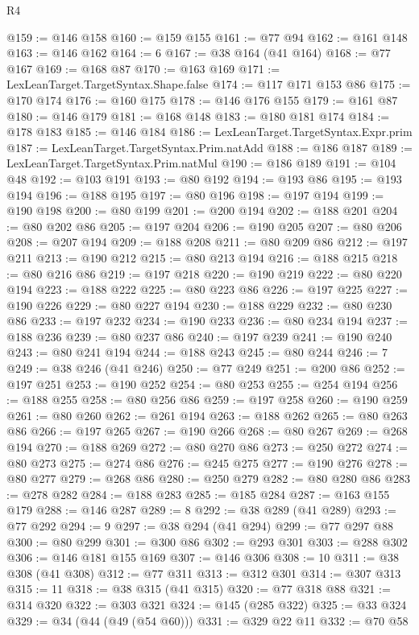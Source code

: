 \begin{lexlean}{R4}
\begin{coremodule}
@159 := @146 @158
@160 := @159 @155
@161 := @77 @94
@162 := @161 @148
@163 := @146 @162
@164 := 6
@167 := @38 @164 (@41 @164)
@168 := @77 @167
@169 := @168 @87
@170 := @163 @169
@171 := LexLeanTarget.TargetSyntax.Shape.false
@174 := @117 @171 @153 @86
@175 := @170 @174
@176 := @160 @175
@178 := @146 @176 @155
@179 := @161 @87
@180 := @146 @179
@181 := @168 @148
@183 := @180 @181 @174
@184 := @178 @183
@185 := @146 @184
@186 := LexLeanTarget.TargetSyntax.Expr.prim
@187 := LexLeanTarget.TargetSyntax.Prim.natAdd
@188 := @186 @187
@189 := LexLeanTarget.TargetSyntax.Prim.natMul
@190 := @186 @189
@191 := @104 @48
@192 := @103 @191
@193 := @80 @192
@194 := @193 @86
@195 := @193 @194
@196 := @188 @195
@197 := @80 @196
@198 := @197 @194
@199 := @190 @198
@200 := @80 @199
@201 := @200 @194
@202 := @188 @201
@204 := @80 @202 @86
@205 := @197 @204
@206 := @190 @205
@207 := @80 @206
@208 := @207 @194
@209 := @188 @208
@211 := @80 @209 @86
@212 := @197 @211
@213 := @190 @212
@215 := @80 @213 @194
@216 := @188 @215
@218 := @80 @216 @86
@219 := @197 @218
@220 := @190 @219
@222 := @80 @220 @194
@223 := @188 @222
@225 := @80 @223 @86
@226 := @197 @225
@227 := @190 @226
@229 := @80 @227 @194
@230 := @188 @229
@232 := @80 @230 @86
@233 := @197 @232
@234 := @190 @233
@236 := @80 @234 @194
@237 := @188 @236
@239 := @80 @237 @86
@240 := @197 @239
@241 := @190 @240
@243 := @80 @241 @194
@244 := @188 @243
@245 := @80 @244
@246 := 7
@249 := @38 @246 (@41 @246)
@250 := @77 @249
@251 := @200 @86
@252 := @197 @251
@253 := @190 @252
@254 := @80 @253
@255 := @254 @194
@256 := @188 @255
@258 := @80 @256 @86
@259 := @197 @258
@260 := @190 @259
@261 := @80 @260
@262 := @261 @194
@263 := @188 @262
@265 := @80 @263 @86
@266 := @197 @265
@267 := @190 @266
@268 := @80 @267
@269 := @268 @194
@270 := @188 @269
@272 := @80 @270 @86
@273 := @250 @272
@274 := @80 @273
@275 := @274 @86
@276 := @245 @275
@277 := @190 @276
@278 := @80 @277
@279 := @268 @86
@280 := @250 @279
@282 := @80 @280 @86
@283 := @278 @282
@284 := @188 @283
@285 := @185 @284
@287 := @163 @155 @179
@288 := @146 @287
@289 := 8
@292 := @38 @289 (@41 @289)
@293 := @77 @292
@294 := 9
@297 := @38 @294 (@41 @294)
@299 := @77 @297 @88
@300 := @80 @299
@301 := @300 @86
@302 := @293 @301
@303 := @288 @302
@306 := @146 @181 @155 @169
@307 := @146 @306
@308 := 10
@311 := @38 @308 (@41 @308)
@312 := @77 @311
@313 := @312 @301
@314 := @307 @313
@315 := 11
@318 := @38 @315 (@41 @315)
@320 := @77 @318 @88
@321 := @314 @320
@322 := @303 @321
@324 := @145 (@285 @322)
@325 := @33 @324
@329 := @34 (@44 (@49 (@54 @60)))
@331 := @329 @22 @11
@332 := @70 @58

\end{coremodule}
\end{lexlean}
